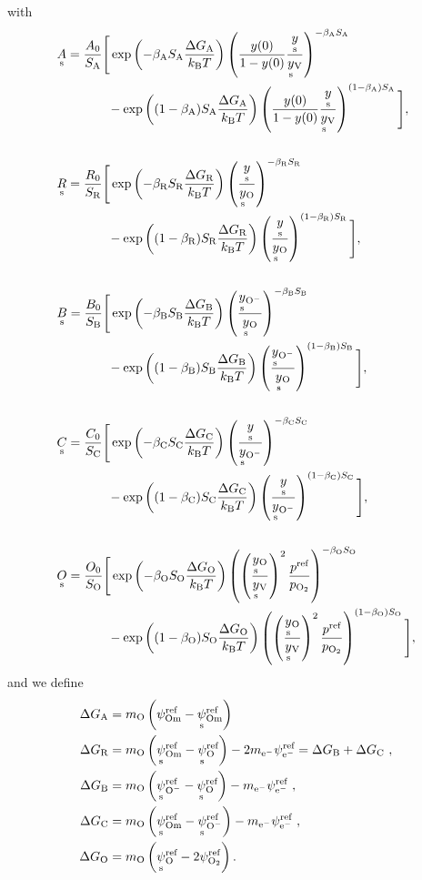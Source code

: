 \documentclass{article}
\numberwithin{equation}{section}
\newcommand{\us}[1]{\underset{\textrm{s}}{#1}{}}
\def\kB{k_\mathrm{B}}
\def\Ox{\mathrm{O}}
\newcommand{\Omin}{{\ce{O-}}}
\def\Om{\mathrm{Om}}
\newcommand{\OO}{{\ce{O2}}}
\def\eM{\mathrm{e^-}}
\def\ys{\us y}
\newcommand{\ysV}{\us y_{\textrm{V}}}
\newcommand{\yOmin}{\us y_{\ce{O-}}}
\def\y0{y(0)}
\def\yOs{\us y_\textrm{O}}
\def\A0{A_0}
\def\B0{B_0}
\def\C0{C_0}
\def\R0{R_0}
\def\K0{O_0}
\def\DGA{\Delta G_\textrm{A}  }
\def\DGB{\Delta G_\textrm{B}  }
\def\DGC{\Delta G_\textrm{C}  }
\def\DGR{\Delta G_\textrm{R}  }
\def\DGO{\Delta G_\textrm{O}  }
\def\betaA{\beta_\textrm{A}}
\def\betaB{\beta_\textrm{B}}
\def\betaC{\beta_\textrm{C}}
\def\betaR{\beta_\textrm{R}}
\def\betaO{\beta_\textrm{O}}
\def\SA{S_\textrm{A}}
\def\SB{S_\textrm{B}}
\def\SC{S_\textrm{C}}
\def\SR{S_\textrm{R}}
\def\SO{S_\textrm{O}}
\def\REF{\textrm{ref}}
\begin{document}
with
\begin{subequations}
\begin{align}
&\us A
=
\frac{\A0}{\SA}
\Bigg[
	\exp
	\left(
		{-\betaA \SA \frac{\DGA}{\kB T}}
	\right)
	\left(
		\frac{\y0}{1 - \y0}
		\frac{\ys}{\ysV}
	\right)^{-\betaA \SA}
\\ \nonumber
	&\quad \quad \quad \quad	
	-
	\exp
	\left(
		{(1-\betaA) \SA \frac{\DGA}{\kB T}}
	\right)
	\left(
		\frac{\y0}{1 - \y0 }
		\frac{\ys}{\ysV}
	\right)^{(1-\betaA) \SA}
\Bigg],
\\ \nonumber
\\
&\us R
=
\frac{\R0}{\SR}
\Bigg[
	\exp
	\left(
		{-\betaR \SR \frac{\DGR}{\kB T}}
	\right)
	\left(
		\frac{\ys}{\yOs}
	\right)^{-\betaR \SR}
\\ \nonumber
	& \quad \quad \quad \quad	
	-
	\exp
	\left(
		{(1 - \betaR) \SR \frac{\DGR}{\kB T}}
	\right)
	\left(
		\frac{\ys}{\yOs}
	\right)^{(1-\betaR) \SR}
\Bigg],
\\ \nonumber
\\
&\us B
=
\frac{\B0}{\SB}
\Bigg[
	\exp
	\left(
		{-\betaB \SB \frac{\DGB}{\kB T}}
	\right)
	\left(
		\frac{\yOmin}{\yOs}
	\right)^{-\betaB \SB}
\\ \nonumber
	& \quad \quad \quad \quad	
	-
	\exp
	\left(
		{(1 - \betaB) \SB \frac{\DGB}{\kB T}}
	\right)
	\left(
		\frac{\yOmin}{\yOs}
	\right)^{(1-\betaB) \SB}
\Bigg],
\\ \nonumber
\\
&\us C
=
\frac{\C0}{\SC}
\Bigg[
	\exp
	\left(
		{-\betaC \SC \frac{\DGC}{\kB T}}
	\right)
	\left(
		\frac{\ys}{\yOmin}
	\right)^{-\betaC \SC}
\\ \nonumber
	& \quad \quad \quad \quad	
	-
	\exp
	\left(
		{(1 - \betaC) \SC \frac{\DGC}{\kB T}}
	\right)
	\left(
		\frac{\ys}{\yOmin}
	\right)^{(1-\betaC) \SC}
\Bigg],
\\ \nonumber
\\
&\us O
=
\frac{\K0}{\SO}
\Bigg[
	\exp
	\left(
		{-\betaO \SO \frac{\DGO}{\kB T}}
	\right)
	\left(
		\left(
			\frac{\yOs}{\ysV}
		\right)^2
   \frac{p^\REF}{p_\OO}
	\right)^{-\betaO \SO}
\\ \nonumber
	&\quad \quad \quad \quad	
	-
	\exp
	\left(
		{(1-\betaO) \SO \frac{\DGO}{\kB T}}
	\right)
	\left(
		\left(
			\frac{\yOs}{\ysV}
		\right)^2
    \frac{p^\REF}{p_\OO}
	\right)^{(1 - \betaO) \SO}
\Bigg],
\end{align}
\end{subequations}
and we define
\begin{subequations}
\begin{align}
\DGA
&=
m_\Ox
\left(
	\psi_{\textrm{Om}}^\REF
	-
	\us \psi_{\textrm{Om}}^\REF
\right)
\\
\DGR
&= 
m_\Ox
\left(
	\us \psi_\Om^\REF
	-
	\us \psi_\Ox^\REF
\right)
-
2m_\eM \psi_\eM^\REF= \DGB + \DGC~,
\\\DGB
&= 
m_\Ox
\left(
	\us \psi_\Omin^\REF
	-
	\us \psi_\Ox^\REF
\right)
-
m_\eM \psi_\eM^\REF~,
\\
\DGC
&= 
m_\Ox
\left(
	\us \psi_\Om^\REF
	-
	\us \psi_\Omin^\REF
\right)
-
m_\eM \psi_\eM^\REF~,
\\
\DGO
&= 
m_\Ox
\left(
	\us \psi_{\Ox}^\REF
	-
	2 \psi_{\OO}^\REF
\right).
\end{align}
\end{subequations}
\end{document}
